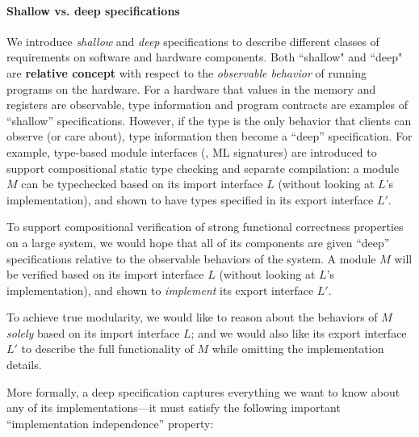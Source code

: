 \paragraph{Shallow vs. deep specifications}
We introduce \emph{shallow} and \emph{deep} specifications to describe different
classes of requirements on software and hardware components.  
Both ``shallow" and ``deep" are \textbf{relative concept} with respect to
the \emph{observable behavior} of running programs on the hardware.
For a hardware that values in the memory and registers
are observable,
type information and program contracts are examples of ``shallow''
specifications. 
However, if the type is the only behavior that clients 
can observe (or care about),
type information then become a ``deep''
specification.
For example, type-based module interfaces (\eg, ML signatures) are
introduced to support compositional static type checking and separate
compilation: a module $M$ can be typechecked based on its import
interface $L$ (without looking at $L$'s implementation), and shown to
have types specified in its export interface $L'$.

To support compositional verification of strong functional correctness
properties on a large system, we would hope that all of its components
are given ``deep'' specifications
relative to the observable behaviors of the system.  A module $M$ will be verified based on
its import interface $L$ (without looking at $L$'s
implementation), and shown to {\em implement} its export interface 
$L'$.

To achieve true modularity, we would like to reason about the
behaviors of $M$ {\em solely} based on its import interface $L$; and
we would also like its export interface $L'$ to describe the full
functionality of $M$ while omitting the implementation details.


More formally, a deep specification captures everything we want to know
about any of its implementations---it must satisfy the following
important ``implementation independence'' property:

\begin{center}
\end{center}%

